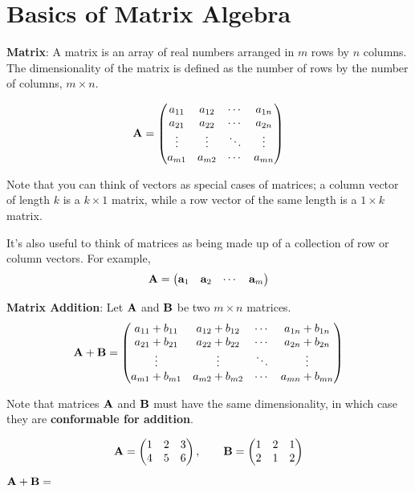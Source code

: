 \documentclass[]{book}
\theoremstyle{definition}
\theoremstyle{definition}
\theoremstyle{definition}
\theoremstyle{remark}
\let\BeginKnitrBlock\begin \let\EndKnitrBlock\end
\begin{document}
\hypertarget{matrixbasics}{%
\section{Basics of Matrix Algebra}\label{matrixbasics}}

\textbf{Matrix}: A matrix is an array of real numbers arranged in \(m\) rows by \(n\) columns. The dimensionality of the matrix is defined as the number of rows by the number of columns, \(m \times n\).

\[{\bf A}=\begin{pmatrix}
            a_{11} & a_{12} & \cdots & a_{1n} \\
            a_{21} & a_{22} & \cdots & a_{2n} \\
            \vdots & \vdots & \ddots & \vdots \\
            a_{m1} & a_{m2} & \cdots & a_{mn}
        \end{pmatrix}\]

Note that you can think of vectors as special cases of matrices; a column vector of length \(k\) is a \(k \times 1\) matrix, while a row vector of the same length is a \(1 \times k\) matrix.

It's also useful to think of matrices as being made up of a collection of row or column vectors. For example,
\[\bf A = \begin{pmatrix} {\bf a}_1 & {\bf a}_2 &  \cdots & {\bf a}_m \end{pmatrix}\]

\textbf{Matrix Addition}: Let \(\bf A\) and \(\bf B\) be two \(m\times n\) matrices.
\[{\bf A+B}=\begin{pmatrix}
            a_{11}+b_{11} & a_{12}+b_{12} & \cdots & a_{1n}+b_{1n} \\
            a_{21}+b_{21} & a_{22}+b_{22} & \cdots & a_{2n}+b_{2n} \\
            \vdots & \vdots  & \ddots & \vdots \\
            a_{m1}+b_{m1} & a_{m2}+b_{m2} & \cdots & a_{mn}+b_{mn}
        \end{pmatrix}\]

Note that matrices \({\bf A}\) and \({\bf B}\) must have the same dimensionality, in which case they are \textbf{conformable for addition}.

\BeginKnitrBlock{example}
\protect\hypertarget{exm:matrixaddition}{}{\label{exm:matrixaddition} }\[{\bf A}=\begin{pmatrix} 1 & 2 & 3 \\ 4 & 5 & 6 \end{pmatrix}, \qquad
            {\bf B}=\begin{pmatrix} 1 & 2 & 1 \\ 2 & 1 & 2 \end{pmatrix}\]
\({\bf A+B}=\)
\EndKnitrBlock{example}
\end{document}
